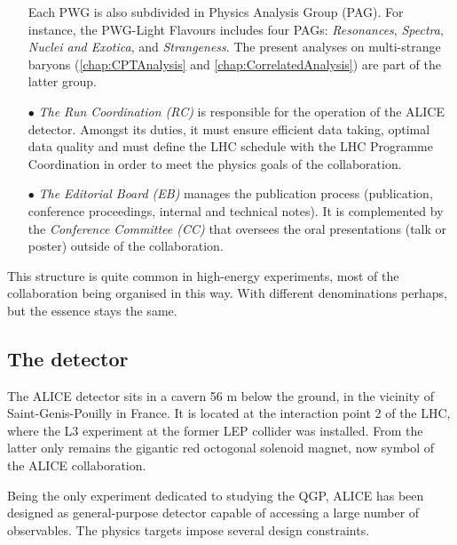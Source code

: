 \begin{itemize}
Each PWG is also subdivided in Physics Analysis Group (PAG). For instance, the PWG-Light Flavours includes four PAGs: \textit{Resonances}, \textit{Spectra}, \textit{Nuclei and Exotica}, and \textit{Strangeness}. The present analyses on multi-strange baryons (\chap\ref{chap:CPTAnalysis} and \ref{chap:CorrelatedAnalysis}) are part of the latter group.

\item[$\bullet$] \textit{The Run Coordination (RC)} is responsible for the operation of the ALICE detector. Amongst its duties, it must ensure efficient data taking, optimal data quality and must define the LHC schedule with the LHC Programme Coordination in order to meet the physics goals of the collaboration.
\item[$\bullet$] \textit{The Editorial Board (EB)} manages the publication process (publication, conference proceedings, internal and technical notes). It is complemented by the \textit{Conference Committee (CC)} that oversees the oral presentations (talk or poster) outside of the collaboration.
\end{itemize}

This structure is quite common in high-energy experiments, most of the collaboration being organised in this way. With different denominations perhaps, but the essence stays the same.

\subsection{The detector}
\label{subsec:ALICEDetector}

The ALICE detector sits in a cavern 56 m below the ground, in the vicinity of Saint-Genis-Pouilly in France. It is located at the interaction point 2 of the LHC, where the L3 experiment at the former LEP collider was installed. From the latter only remains the gigantic red octogonal solenoid magnet, now symbol of the ALICE collaboration.

Being the only experiment dedicated to studying the QGP, ALICE has been designed as general-purpose detector capable of accessing a large number of observables. The physics targets impose several design constraints.

